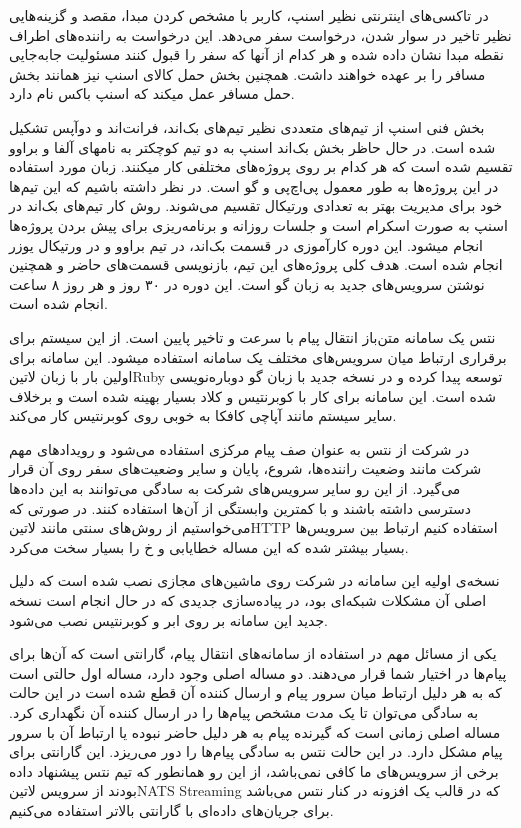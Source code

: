 \documentclass[a4]{report}
\begin{document}
در تاکسی‌های اینترنتی نظیر اسنپ، کاربر با مشخص کردن مبدا، مقصد و گزینه‌هایی نظیر تاخیر در سوار
شدن، درخواست سفر می‌دهد. این درخواست به راننده‌های اطراف نقطه مبدا نشان داده شده و هر کدام از آنها
که سفر را قبول کنند مسئولیت جابه‌جایی مسافر را بر عهده خواهند داشت. همچنین بخش حمل کالای اسنپ
نیز همانند بخش حمل مسافر عمل میکند که اسنپ باکس نام دارد.

بخش فنی اسنپ از تیم‌های متعددی نظیر تیم‌های بک‌اند، فرانت‌اند و دوآپس
تشکیل شده است. در حال حاظر بخش بک‌اند اسنپ به دو تیم کوچکتر به نامهای آلفا و براوو تقسیم شده است که هر کدام بر روی پروژه‌های مختلفی کار میکنند. زبان مورد استفاده در این پروژه‌ها به طور معمول پی‌اچ‌پی و گو است.
در نظر داشته باشیم که این تیم‌ها خود برای مدیریت بهتر به تعدادی ورتیکال تقسیم می‌شوند.
روش کار تیم‌های بک‌اند در اسنپ به صورت اسکرام است و جلسات روزانه و برنامه‌ریزی برای پیش بردن پروژه‌ها انجام میشود.
این دوره کارآموزی در قسمت بک‌اند، در تیم براوو و در ورتیکال یوزر انجام شده است. هدف کلی پروژه‌های این تیم، بازنویسی
قسمت‌های حاضر و همچنین نوشتن سرویس‌های جدید به زبان گو است. این دوره در ۳۰ روز و هر روز ۸ ساعت انجام شده است.

نتس یک سامانه متن‌باز انتقال پیام با سرعت و تاخیر پایین است. از این سیستم برای برقراری ارتباط میان سرویس‌های مختلف یک سامانه استفاده میشود.
این سامانه برای اولین بار با زبان ‌لاتین{Ruby} توسعه پیدا کرده و در نسخه جدید با زبان گو دوباره‌نویسی شده است. این سامانه برای کار با کوبرنتیس و کلاد بسیار بهینه شده است
و برخلاف سایر سیستم مانند آپاچی کافکا به خوبی روی کوبرنتیس کار می‌کند.

در شرکت از نتس به عنوان صف پیام مرکزی استفاده می‌شود و رویدادهای مهم شرکت مانند وضعیت راننده‌ها، شروع، پایان و سایر وضعیت‌های سفر روی آن قرار می‌گیرد.
از این رو سایر سرویس‌های شرکت به سادگی می‌توانند به این داده‌ها دسترسی داشته باشند و با کمترین وابستگی از آن‌ها استفاده ‌کنند. در صورتی که می‌خواستیم از روش‌های سنتی مانند ‌لاتین{HTTP}
استفاده کنیم ارتباط بین سرویس‌ها بسیار بیشتر شده که این مساله خطایابی و ‌خ را بسیار سخت می‌کرد.

نسخه‌ی اولیه این سامانه در شرکت روی ماشین‌های مجازی نصب شده است که دلیل اصلی آن مشکلات شبکه‌ای بود، در پیاده‌سازی جدیدی که در حال انجام است نسخه جدید این سامانه بر روی ابر و کوبرنتیس نصب می‌شود.

یکی از مسائل مهم در استفاده از سامانه‌های انتقال پیام، گارانتی است که آن‌ها برای پیام‌ها در اختیار شما قرار می‌دهند. دو مساله اصلی وجود دارد، مساله اول حالتی است که به هر دلیل ارتباط میان سرور پیام و ارسال کننده آن قطع شده است
در این حالت به سادگی می‌توان تا یک مدت مشخص پیام‌ها را در ارسال کننده آن نگهداری کرد. مساله اصلی زمانی است که گیرنده پیام به هر دلیل حاضر نبوده یا ارتباط آن با سرور پیام مشکل دارد. در این حالت نتس به سادگی پیام‌ها را دور می‌ریزد.
این گارانتی برای برخی از سرویس‌های ما کافی نمی‌باشد، از این رو همانطور که تیم نتس پیشنهاد داده بودند از سرویس ‌لاتین{NATS Streaming} که در قالب یک افزونه در کنار نتس می‌باشد برای جریان‌های داده‌ای با گارانتی بالاتر استفاده می‌کنیم.
\end{document}

